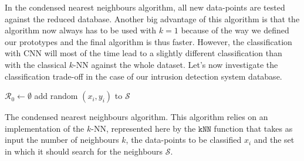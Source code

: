 In the condensed nearest neighbours algorithm, all new data-points are tested against the reduced database. Another big advantage of this algorithm is that the algorithm now always has to be used with $k=1$ because of the way we defined our prototypes and the final algorithm is thus faster. However, the classification with CNN will most of the time lead to a slightly different classification than with the classical $k$-NN against the whole dataset. Let's now investigate the classification trade-off in the case of our intrusion detection system database. 

\begin{center}
\begin{algorithm}[H]
\DontPrintSemicolon
{}

$\mathcal{R}_0 \leftarrow \emptyset$ \;
add random $\left(x_i, y_i\right)$ to $\mathcal{S}$ \;

\caption{The condensed nearest neighbours algorithm. This algorithm relies on an implementation of the $k$-NN, represented here by the $\mathtt{kNN}$ function that takes as input the number of neighbours $k$, the data-points to be classified $x_i$ and the set in which it should search for the neighbours $\mathcal{S}$.}
\label{alg:cnn}
\end{algorithm}
\end{center}